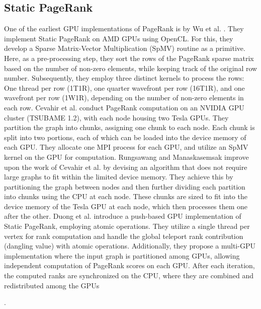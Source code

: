 \subsection{Static PageRank}

One of the earliest GPU implementations of PageRank is by Wu et al. \cite{rank-wu10}. They implement Static PageRank on AMD GPUs using OpenCL. For this, they develop a Sparse Matrix-Vector Multiplication (SpMV) routine as a primitive. Here, as a pre-processing step, they sort the rows of the PageRank sparse matrix based on the number of non-zero elements, while keeping track of the original row number. Subsequently, they employ three distinct kernels to process the rows: One thread per row (1T1R), one quarter wavefront per row (16T1R), and one wavefront per row (1W1R), depending on the number of non-zero elements in each row. Cevahir et al. \cite{cevahir2010efficient} conduct PageRank computation on an NVIDIA GPU cluster (TSUBAME 1.2), with each node housing two Tesla GPUs. They partition the graph into chunks, assigning one chunk to each node. Each chunk is split into two portions, each of which can be loaded into the device memory of each GPU. They allocate one MPI process for each GPU, and utilize an SpMV kernel on the GPU for computation. Rungsawang and Manaskasemsak \cite{rank-rungsawang12} improve upon the work of Cevahir et al. \cite{cevahir2010efficient} by devising an algorithm that does not require large graphs to fit within the limited device memory. They achieve this by partitioning the graph between nodes and then further dividing each partition into chunks using the CPU at each node. These chunks are sized to fit into the device memory of the Tesla GPU at each node, which then processes them one after the other. Duong et al. \cite{rank-duong12} introduce a push-based GPU implementation of Static PageRank, employing atomic operations. They utilize a single thread per vertex for rank computation and handle the global teleport rank contribution (dangling value) with atomic operations. Additionally, they propose a multi-GPU implementation where the input graph is partitioned among GPUs, allowing independent computation of PageRank scores on each GPU. After each iteration, the computed ranks are synchronized on the CPU, where they are combined and redistributed among the GPUs.

